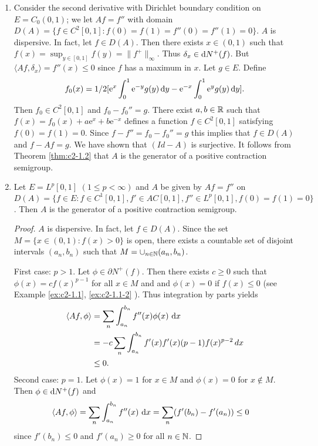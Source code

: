 \begin{examples}\label{ex:c2-1.5}
%
%
\begin{enumerate}[\upshape (i), wide, labelindent=.5em] %
\item \label{ex:c2-1.5-1}
Consider the second derivative with Dirichlet boundary condition on $E = C_{0}(0,1)$; \ie we let $Af = f''$ with domain $D(A) = \{f \in C^{2}[0,1] \colon f(0) = f(1) = f''(0) = f''(1) = 0\}$.
$A$ is dispersive. 
In fact, let $f \in D(A)$. 
Then there exists $x \in (0,1)$ such that $f(x) = \sup_{y \in [0,1]} f(y) = \|f^{+}\|_{\infty}$. 
Thus $\delta_{x} \in \mathop{}\!\mathrm{d}{N^{+}}(f)$. 
But $\langle Af,\delta_{x} \rangle = f''(x) \leq 0$ since $f$ has a maximum in $x$.
Let $g \in E$. 
Define 
\[
f_{0}(x) = 1/2 [\mathrm{e}^{x} \int_{0}^{1} \mathrm{e}^{-y}g(y) \mathop{}\!\mathrm{d}{y} - \mathrm{e}^{-x} \int_{0}^{1} \mathrm{e}^{y}g(y) \mathop{}\!\mathrm{d}{y}].
\]
Then $f_{0} \in C^{2}[0,1]$ and $f_{0} - f_{0}'' = g$. 
There exist $a, b \in \mathbb{R}$ such that $f(x) = f_{0}(x) + a\mathrm{e}^{x} + b\mathrm{e}^{-x}$ defines a function $f \in C^{2}[0,1]$ satisfying $f(0) = f(1) = 0$. Since $f - f'' = f_{0} - f_{0}'' = g$ this implies that $f \in D(A)$ and $f - Af = g$. We have shown that $(Id - A)$ is surjective. It follows from Theorem 
\ref{thm:c2-1.2} that $A$ is the generator of a positive contraction semigroup.
\item \label{ex:c2-1.5-2}
Let $E = L^{p}[0,1]$ $(1 \leq p < \infty)$ and $A$ be given by $Af = f''$ on $D(A) = \{f \in E \colon f \in C^{1}[0,1], f' \in AC[0,1], f'' \in L^{p}[0,1], f(0) = f(1) = 0\}$. 
Then $A$ is the generator of a positive contraction semigroup.
\begin{proof}
$A$ is dispersive. 
In fact, let $f \in D(A)$. 
Since the set $M = \{x \in (0,1) \colon f(x) > 0\}$ is open, there exists a countable set of disjoint intervals $(a_{n},b_{n})$ such that $M = \cup_{n \in \mathbb{N}} (a_{n},b_{n})$.

First case: $p > 1$.
Let $\phi \in \partial N^{+}(f)$. 
Then there exists $c \geq 0$ such that $\phi(x) = c f(x)^{p-1}$ for all $x \in M$ and and $\phi(x) = 0$ if $f(x) \leq 0$ (see Example \ref{ex:c2-1.1}, \ref{ex:c2-1.1-2} ). 
Thus integration by parts yields
\begin{align*}
\langle Af,\phi \rangle &= \sum_{n} \int_{a_{n}}^{b_{n}} f''(x)\phi(x) \, \mathop{}\!\mathrm{d}{x} \\
&= -c \sum_{n} \int_{a_{n}}^{b_{n}} f'(x)f'(x) (p-1)f(x)^{p-2} \, dx \\
&\leq 0.
\end{align*}
Second case: $p = 1$.
Let $\phi(x) = 1$ for $x \in M$ and $\phi(x) = 0$ for $x \not\in M$. 
Then $\phi \in \mathop{}\!\mathrm{d}{N^{+}}(f)$ and
\begin{align*}
\langle Af,\phi \rangle &= \sum_{n} \int_{a_{n}}^{b_{n}} f''(x) \, \mathop{}\!\mathrm{d}{x} = \sum_{n} (f'(b_{n}) - f'(a_{n})) \leq 0
\end{align*}
since $f'(b_{n}) \leq 0$ and $f'(a_{n}) \geq 0$ for all $n \in \mathbb{N}$.


\end{proof}
\end{enumerate}
\end{examples}
